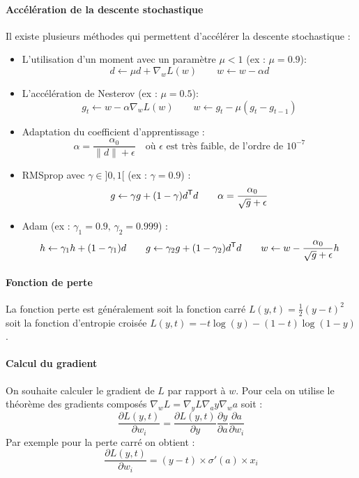\paragraph{Accélération de la descente stochastique}
Il existe plusieurs méthodes qui permettent d'accélérer la descente stochastique :
\begin{itemize}
	\item L'utilisation d'un moment avec un paramètre $\mu < 1$ (ex : $\mu = 0.9$): \vspace{-2mm}
		$$ d \gets \mu d + \nabla_w L(w) \qquad w \gets w - \alpha d $$
	\item L'accélération de Nesterov (ex : $\mu = 0.5$): \vspace{-2mm}
		$$ g_t \gets w - \alpha \nabla_w L(w) \qquad w \gets g_t - \mu (g_t - g_{t-1}) $$
	\item Adaptation du coefficient d'apprentissage : \vspace{-2mm}
		$$ \alpha = \frac{\alpha_0}{\| d \| + \epsilon} \quad \text{où } \epsilon \text{ est très faible, de l'ordre de } 10^{-7} $$
	\item  RMSprop avec $\gamma \in ]0, 1[$ (ex : $\gamma = 0.9$) : \vspace{-2mm}
		$$ g \gets \gamma g + (1 - \gamma) d^{\mathsf{T}} d \qquad \alpha = \frac{\alpha_0}{\sqrt{g} + \epsilon} $$
	 \item Adam (ex : $\gamma_1 = 0.9, \, \gamma_2 = 0.999$) :
	 	$$ h \gets \gamma_1 h + (1 - \gamma_1) d \qquad g \gets \gamma_2 g + (1 - \gamma_2) d^{\mathsf{T}} d \qquad w \gets w - \frac{\alpha_0}{\sqrt{g} + \epsilon} h $$
\end{itemize}

\paragraph{Fonction de perte}
La fonction perte est généralement soit la fonction carré $L(y, t) = \frac{1}{2} (y - t)^2$ soit la fonction d'entropie croisée $L(y, t) = -t \log(y) - (1-t) \log(1-y)$.

\paragraph{Calcul du gradient}
On souhaite calculer le gradient de $L$ par rapport à $w$. Pour cela on utilise le théorème des gradients composés $\nabla_w L = \nabla_y L \nabla_a y \nabla_w a$ soit :
$$ \dfrac{\partial L(y, t)}{\partial w_i} = \dfrac{\partial L(y, t)}{\partial y} \dfrac{\partial y}{\partial a} \dfrac{\partial a}{\partial w_i} $$
Par exemple pour la perte carré on obtient :
$$ \dfrac{\partial L(y, t)}{\partial w_i} = (y - t) \times \sigma'(a) \times x_i $$

